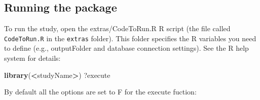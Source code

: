 \documentclass[
]{article}
\newenvironment{Shaded}{\begin{snugshade}}{\end{snugshade}}
\newcommand{\KeywordTok}[1]{\textcolor[rgb]{0.13,0.29,0.53}{\textbf{#1}}}
\newcommand{\NormalTok}[1]{#1}
\newcommand{\OperatorTok}[1]{\textcolor[rgb]{0.81,0.36,0.00}{\textbf{#1}}}
\begin{document}
\hypertarget{running-the-package}{%
\subsection{Running the package}\label{running-the-package}}

To run the study, open the extras/CodeToRun.R R script (the file called
\texttt{CodeToRun.R} in the \texttt{extras} folder). This folder
specifies the R variables you need to define (e.g., outputFolder and
database connection settings). See the R help system for details:

\begin{Shaded}
\begin{Highlighting}[]
\KeywordTok{library}\NormalTok{(}\OperatorTok{<}\NormalTok{studyName}\OperatorTok{>}\NormalTok{)}
\NormalTok{?execute}
\end{Highlighting}
\end{Shaded}

By default all the options are set to F for the execute fuction:
\end{document}
